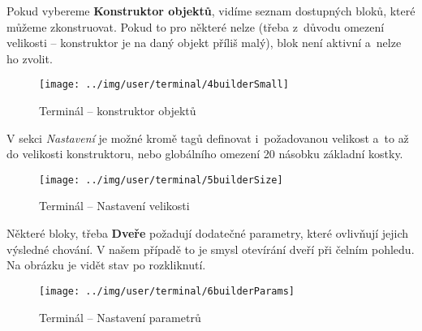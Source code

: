 \FloatBarrier

Pokud vybereme \textbf{Konstruktor objektů}, vidíme seznam dostupných bloků, které můžeme zkonstruovat. Pokud to pro některé nelze (třeba z~důvodu omezení velikosti -- konstruktor je na daný objekt příliš malý), blok není aktivní a~nelze ho zvolit.


\begin{figure}[!ht]\centering
\texttt{[image: ../img/user/terminal/4builderSmall]}

\caption{Terminál -- konstruktor objektů}
\label{fig:user_terminal_4builderSmall}

\end{figure}

\FloatBarrier

V sekci \textit{Nastavení} je možné kromě tagů definovat i~požadovanou velikost a~to až do velikosti konstruktoru, nebo globálního omezení 20 násobku základní kostky.

\begin{figure}[!ht]\centering
\texttt{[image: ../img/user/terminal/5builderSize]}

\caption{Terminál -- Nastavení velikosti}
\label{fig:user_terminal_5builderSize}

\end{figure}

\FloatBarrier

Některé bloky, třeba \textbf{Dveře} požadují dodatečné parametry, které ovlivňují jejich výsledné chování. V našem případě to je smysl otevírání dveří při čelním pohledu. Na obrázku je vidět stav po rozkliknutí.

\begin{figure}[!ht]\centering
\texttt{[image: ../img/user/terminal/6builderParams]}

\caption{Terminál -- Nastavení parametrů}
\label{fig:user_terminal_6builderParams}

\end{figure}

\FloatBarrier